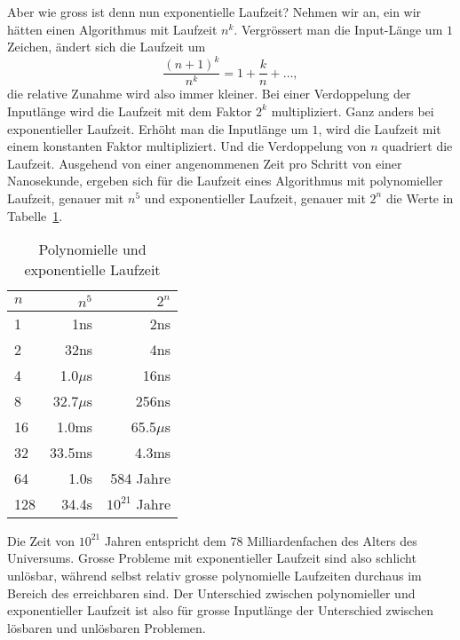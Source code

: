 Aber wie gross ist denn nun exponentielle Laufzeit?
Nehmen wir an,
ein wir hätten einen Algorithmus mit Laufzeit $n^k$. Vergrössert
man die Input-Länge um $1$ Zeichen, ändert sich die Laufzeit um
\[
\frac{(n+1)^k}{n^k}
=
1+\frac{k}{n} +\dots,
\]
die relative Zunahme wird also immer kleiner. Bei einer Verdoppelung
der Inputlänge wird die Laufzeit mit dem Faktor $2^k$ multipliziert.
Ganz anders bei exponentieller Laufzeit.
Erhöht man die Inputlänge um $1$, wird die Laufzeit mit einem
konstanten Faktor multipliziert. Und die Verdoppelung von $n$
quadriert die Laufzeit.
Ausgehend von einer angenommenen
Zeit pro Schritt von einer Nanosekunde, ergeben sich
für die Laufzeit eines Algorithmus
mit polynomieller Laufzeit, genauer mit $n^5$ und exponentieller Laufzeit,
genauer mit $2^n$ die Werte in Tabelle~\ref{laufzeittabelle}.
\begin{table}
\begin{center}
\begin{tabular}{|l|rr|}
\hline
$n$&$n^5$&$2^n$\\
\hline
  1&             1ns&             2ns\\
  2&            32ns&             4ns\\
  4&       1.0$\mu$s&            16ns\\
  8&      32.7$\mu$s&           256ns\\
 16&           1.0ms&      65.5$\mu$s\\
 32&          33.5ms&           4.3ms\\
 64&            1.0s&       584 Jahre\\
128&           34.4s& $10^{21}$ Jahre\\
\hline
\end{tabular}
\end{center}
\caption{Polynomielle und exponentielle Laufzeit\label{laufzeittabelle}}
\end{table}
Die Zeit von $10^{21}$ Jahren entspricht dem 78 Milliardenfachen des
Alters des Universums. Grosse Probleme mit exponentieller Laufzeit
sind also schlicht unlösbar, während selbst relativ grosse
polynomielle Laufzeiten durchaus im Bereich des erreichbaren sind.
Der Unterschied zwischen polynomieller und exponentieller Laufzeit
ist also für grosse Inputlänge der Unterschied zwischen lösbaren und
unlösbaren Problemen.

